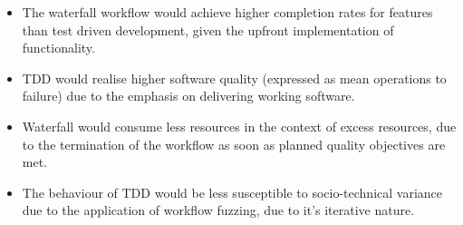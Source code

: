 \documentclass{sig-alternate}
\begin{document}
\begin{itemize}

\item The waterfall workflow would achieve higher completion rates for features than test driven development, given the
  upfront implementation of functionality.

\item TDD would realise higher software quality (expressed as mean operations to failure) due to the emphasis on
  delivering working software.

\item Waterfall would consume less resources in the context of excess resources, due to the termination of the workflow
  as soon as planned quality objectives are met.

\item The behaviour of TDD would be less susceptible to socio-technical variance due to the application of workflow
  fuzzing, due to it's iterative nature.

\end{itemize}
\end{document}
